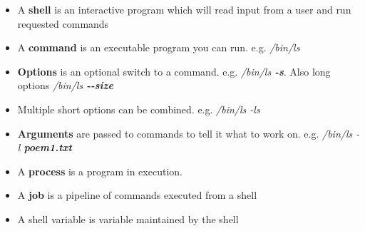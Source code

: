 \begin{itemize}
\item A \textbf{shell} is an interactive program which will read input
  from a user and run requested commands
\item A \textbf{command} is an executable program you can run. e.g. \textit{/bin/ls}
\item \textbf{Options} is an optional switch to a
  command. e.g. \textit{/bin/ls \textbf{-s}}. Also long options \textit{/bin/ls \textbf{-{}-size}}
\item Multiple short options can be combined. e.g. \textit{/bin/ls -ls}
\item \textbf{Arguments} are passed to commands to tell it what to
  work on. e.g. \textit{/bin/ls -l \textbf{poem1.txt}}
\item A \textbf{process} is a program in execution.
\item A \textbf{job} is a pipeline of commands executed from a shell
\item A shell variable is variable maintained by the shell
\end{itemize}



